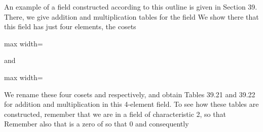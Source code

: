 \documentclass[11pt,oneside]{article}
\begin{document}
\begin{BookBody}



\end{BookBody}

\BookNarrativetrue

\begin{BookBody}

An example of a field constructed according to this outline is given in Section 39. There, we give addition and multiplication tables for the field  We show there that this field has just four elements, the cosets

\begin{center}\begin{adjustbox}{max width=\linewidth}\end{adjustbox}\end{center}

\noindent and

\begin{center}\begin{adjustbox}{max width=\linewidth}\end{adjustbox}\end{center}

\noindent We rename these four cosets  and  respectively, and obtain Tables 39.21 and 39.22 for addition and multiplication in this 4-element field. To see how these tables are constructed, remember that we are in a field of characteristic 2, so that \BookInline{\alpha + \alpha = }  Remember also that \BookInline{\alpha } is a zero of  so that  0 and consequently 

\end{BookBody}
\end{document}
